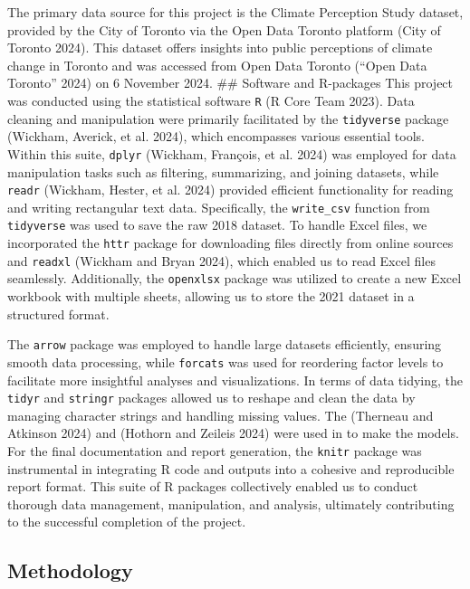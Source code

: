 \documentclass[
  letterpaper,
  DIV=11,
  numbers=noendperiod]{scrartcl}
\begin{document}
The primary data source for this project is the Climate Perception Study
dataset, provided by the City of Toronto via the Open Data Toronto
platform (City of Toronto 2024). This dataset offers insights into
public perceptions of climate change in Toronto and was accessed from
Open Data Toronto ({``Open Data Toronto''} 2024) on 6 November 2024.
\#\# Software and R-packages This project was conducted using the
statistical software \texttt{R} (R Core Team 2023). Data cleaning and
manipulation were primarily facilitated by the \texttt{tidyverse}
package (Wickham, Averick, et al. 2024), which encompasses various
essential tools. Within this suite, \texttt{dplyr} (Wickham, François,
et al. 2024) was employed for data manipulation tasks such as filtering,
summarizing, and joining datasets, while \texttt{readr} (Wickham,
Hester, et al. 2024) provided efficient functionality for reading and
writing rectangular text data. Specifically, the \texttt{write\_csv}
function from \texttt{tidyverse} was used to save the raw 2018 dataset.
To handle Excel files, we incorporated the \texttt{httr} package for
downloading files directly from online sources and \texttt{readxl}
(Wickham and Bryan 2024), which enabled us to read Excel files
seamlessly. Additionally, the \texttt{openxlsx} package was utilized to
create a new Excel workbook with multiple sheets, allowing us to store
the 2021 dataset in a structured format.

The \texttt{arrow} package was employed to handle large datasets
efficiently, ensuring smooth data processing, while \texttt{forcats} was
used for reordering factor levels to facilitate more insightful analyses
and visualizations. In terms of data tidying, the \texttt{tidyr} and
\texttt{stringr} packages allowed us to reshape and clean the data by
managing character strings and handling missing values. The (Therneau
and Atkinson 2024) and (Hothorn and Zeileis 2024) were used in to make
the models. For the final documentation and report generation, the
\texttt{knitr} package was instrumental in integrating R code and
outputs into a cohesive and reproducible report format. This suite of R
packages collectively enabled us to conduct thorough data management,
manipulation, and analysis, ultimately contributing to the successful
completion of the project.

\subsection{Methodology}\label{methodology}
\end{document}

